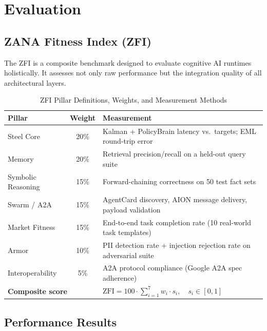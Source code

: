 \documentclass[12pt,a4paper]{article}
\begin{document}
\section{Evaluation}

\subsection{ZANA Fitness Index (ZFI)}

The ZFI is a composite benchmark designed to evaluate cognitive AI runtimes holistically.
It assesses not only raw performance but the integration quality of all architectural layers.

\begin{table}[H]
\centering
\caption{ZFI Pillar Definitions, Weights, and Measurement Methods}
\begin{tabular}{@{}p{3.5cm}cp{7cm}@{}}
\toprule
\textbf{Pillar} & \textbf{Weight} & \textbf{Measurement}\\
\midrule
Steel Core       & 20\% & Kalman + PolicyBrain latency vs.\ targets; EML round-trip error\\
Memory           & 20\% & Retrieval precision/recall on a held-out query suite\\
Symbolic Reasoning & 15\% & Forward-chaining correctness on 50 test fact sets\\
Swarm / A2A      & 15\% & AgentCard discovery, AION message delivery, payload validation\\
Market Fitness   & 15\% & End-to-end task completion rate (10 real-world task templates)\\
Armor            & 10\% & PII detection rate + injection rejection rate on adversarial suite\\
Interoperability & 5\%  & A2A protocol compliance (Google A2A spec adherence)\\
\midrule
\multicolumn{2}{l}{\textbf{Composite score}} &
  $\displaystyle\mathrm{ZFI} = 100 \cdot \sum_{i=1}^{7} w_i \cdot s_i,\quad s_i \in [0,1]$\\
\bottomrule
\end{tabular}
\end{table}

\subsection{Performance Results}
\end{document}
